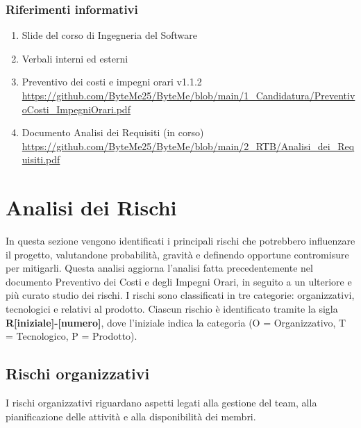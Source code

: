 \documentclass[11pt,a4paper]{article}
\begin{document}
\subsubsection{Riferimenti informativi}
\begin{enumerate}
    \item Slide del corso di Ingegneria del Software
    \item Verbali interni ed esterni
    \item Preventivo dei costi e impegni orari v1.1.2 
    \url{https://github.com/ByteMe25/ByteMe/blob/main/1_Candidatura/PreventivoCosti_ImpegniOrari.pdf}
    \item Documento Analisi dei Requisiti (in corso) 
    \url{https://github.com/ByteMe25/ByteMe/blob/main/2_RTB/Analisi_dei_Requisiti.pdf}
\end{enumerate}

\newpage

\section{Analisi dei Rischi}
In questa sezione vengono identificati i principali rischi che potrebbero influenzare il progetto, valutandone probabilità, gravità e definendo opportune contromisure per mitigarli. Questa analisi aggiorna l'analisi fatta precedentemente nel documento Preventivo dei Costi e degli Impegni Orari, in seguito a un ulteriore e più curato studio dei rischi.
I rischi sono classificati in tre categorie: organizzativi, tecnologici e relativi al prodotto. Ciascun rischio è identificato tramite la sigla \textbf{R[iniziale]-[numero]}, dove l'iniziale indica la categoria (O = Organizzativo, T = Tecnologico, P = Prodotto).

\subsection{Rischi organizzativi}
I rischi organizzativi riguardano aspetti legati alla gestione del team, alla pianificazione delle attività e alla disponibilità dei membri.
\end{document}
